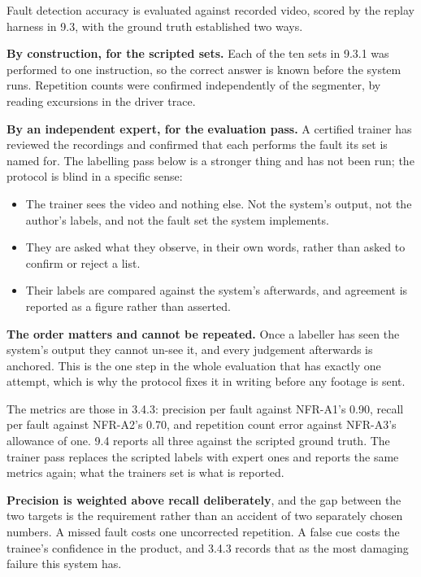 Fault detection accuracy is evaluated against recorded video, scored by the replay harness in 9.3, with the ground truth established two ways.

\textbf{By construction, for the scripted sets.} Each of the ten sets in 9.3.1 was performed to one instruction, so the correct answer is known before the system runs. Repetition counts were confirmed independently of the segmenter, by reading excursions in the driver trace.

\textbf{By an independent expert, for the evaluation pass.} A certified trainer has reviewed the recordings and confirmed that each performs the fault its set is named for. The labelling pass below is a stronger thing and has not been run; the protocol is blind in a specific sense:

\begin{itemize}
\item The trainer sees the video and nothing else. Not the system's output, not the author's labels, and not the fault set the system implements.
\item They are asked what they observe, in their own words, rather than asked to confirm or reject a list.
\item Their labels are compared against the system's afterwards, and agreement is reported as a figure rather than asserted.
\end{itemize}

\textbf{The order matters and cannot be repeated.} Once a labeller has seen the system's output they cannot un-see it, and every judgement afterwards is anchored. This is the one step in the whole evaluation that has exactly one attempt, which is why the protocol fixes it in writing before any footage is sent.

The metrics are those in 3.4.3: precision per fault against NFR-A1's 0.90, recall per fault against NFR-A2's 0.70, and repetition count error against NFR-A3's allowance of one. 9.4 reports all three against the scripted ground truth. The trainer pass replaces the scripted labels with expert ones and reports the same metrics again; what the trainers set is what is reported.

\textbf{Precision is weighted above recall deliberately}, and the gap between the two targets is the requirement rather than an accident of two separately chosen numbers. A missed fault costs one uncorrected repetition. A false cue costs the trainee's confidence in the product, and 3.4.3 records that as the most damaging failure this system has.

